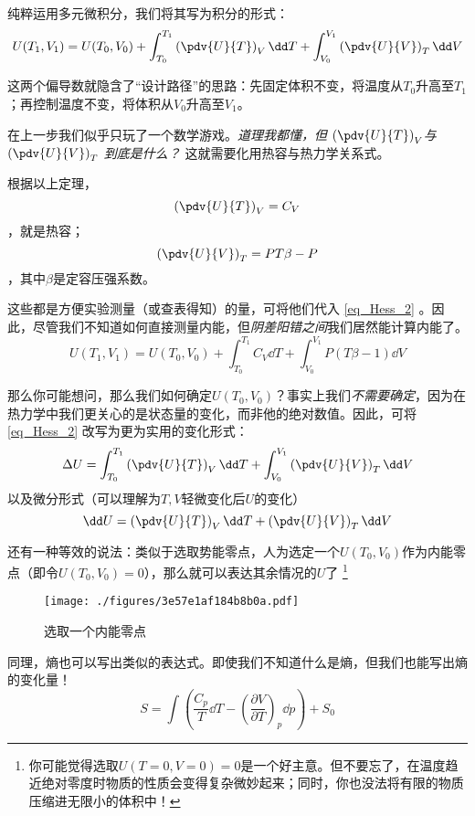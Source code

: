 纯粹运用多元微积分，我们将其写为积分的形式：
\begin{equation}\label{eq_Hess_2}
U(T_1,V_1)=U(T_0,V_0) + \int_{T_0}^{T_1} \left(\pdv{U}{T}\right)_V \dd T + \int_{V_0}^{V_1} \left(\pdv{U}{V}\right)_T \dd V 
\end{equation}

这两个偏导数就隐含了“设计路径”的思路：先固定体积不变，将温度从$T_0$升高至$T_1$；再控制温度不变，将体积从$V_0$升高至$V_1$。

在上一步我们似乎只玩了一个数学游戏。\textsl{道理我都懂，但 $\left(\pdv{U}{T}\right)_V$与$ \left(\pdv{U}{V}\right)_T $ 到底是什么？} 这就需要化用热容与热力学关系式。

根据以上定理，$$\left(\pdv{U}{T}\right)_V = C_V$$，就是热容；$$ \left(\pdv{U}{V}\right)_T  = PT\beta-P $$，其中$\beta$是定容压强系数。

这些都是方便实验测量（或查表得知）的量，可将他们代入 \autoref{eq_Hess_2} 。因此，尽管我们不知道如何直接测量内能，但\textsl{阴差阳错之间}我们居然能计算内能了。
\begin{equation}\label{eq_Hess_1}
U(T_1,V_1)=U(T_0,V_0) + \int_{T_0}^{T_1} C_V \dd T + \int_{V_0}^{V_1} P(T\beta-1) \dd V 
\end{equation}



那么你可能想问，那么我们如何确定$U(T_0,V_0)$？事实上我们\textsl{不需要确定}，因为在热力学中我们更关心的是状态量的变化，而非他的绝对数值。因此，可将\autoref{eq_Hess_2} 改写为更为实用的变化形式：
\begin{equation}
\Delta U = \int_{T_0}^{T_1} \left(\pdv{U}{T}\right)_V \dd T + \int_{V_0}^{V_1} \left(\pdv{U}{V}\right)_T \dd V 
\end{equation}
以及微分形式（可以理解为$T,V$轻微变化后$U$的变化）
\begin{equation}
\dd U =  \left(\pdv{U}{T}\right)_V \dd T +\left(\pdv{U}{V}\right)_T \dd V 
\end{equation}

还有一种等效的说法：类似于选取势能零点，人为选定一个$U(T_0,V_0)$作为内能零点（即令$U(T_0,V_0)=0$），那么就可以表达其余情况的$U$了 \footnote{你可能觉得选取$U(T = 0,V = 0)=0$是一个好主意。但不要忘了，在温度趋近绝对零度时物质的性质会变得复杂微妙起来；同时，你也没法将有限的物质压缩进无限小的体积中！}

\begin{figure}[ht]
\centering
\texttt{[image: ./figures/3e57e1af184b8b0a.pdf]}
\caption{选取一个内能零点} \label{fig_Hess_6}
\end{figure}

同理，熵也可以写出类似的表达式。即使我们不知道什么是熵，但我们也能写出熵的变化量！
\begin{equation}
S=\int \left(\frac{C_p}{T}\dd T-\left(\frac{\partial V}{\partial T}\right)_p\dd p\right)+S_0
\end{equation}